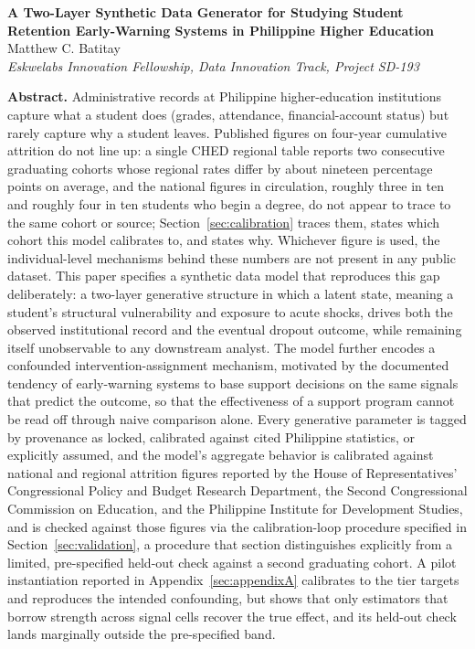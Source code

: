 \documentclass[11pt]{article}
\begin{document}
\begin{tcolorbox}[colback=titlebox,colframe=titlebox,arc=4mm,boxrule=0pt,left=10mm,right=10mm,top=6mm,bottom=6mm]
\begin{center}
{\sffamily\bfseries\LARGE A Two-Layer Synthetic Data Generator for Studying Student Retention Early-Warning Systems in Philippine Higher Education}\\[10pt]
{\large Matthew C. Batitay}\\[2pt]
{\itshape Eskwelabs Innovation Fellowship, Data Innovation Track, Project SD-193}
\end{center}
\vspace{6pt}

\noindent\textbf{Abstract.} Administrative records at Philippine higher-education institutions capture what a student does (grades, attendance, financial-account status) but rarely capture why a student leaves. Published figures on four-year cumulative attrition do not line up: a single CHED regional table reports two consecutive graduating cohorts whose regional rates differ by about nineteen percentage points on average, and the national figures in circulation, roughly three in ten and roughly four in ten students who begin a degree, do not appear to trace to the same cohort or source; Section~\ref{sec:calibration} traces them, states which cohort this model calibrates to, and states why. Whichever figure is used, the individual-level mechanisms behind these numbers are not present in any public dataset. This paper specifies a synthetic data model that reproduces this gap deliberately: a two-layer generative structure in which a latent state, meaning a student's structural vulnerability and exposure to acute shocks, drives both the observed institutional record and the eventual dropout outcome, while remaining itself unobservable to any downstream analyst. The model further encodes a confounded intervention-assignment mechanism, motivated by the documented tendency of early-warning systems to base support decisions on the same signals that predict the outcome, so that the effectiveness of a support program cannot be read off through naive comparison alone. Every generative parameter is tagged by provenance as locked, calibrated against cited Philippine statistics, or explicitly assumed, and the model's aggregate behavior is calibrated against national and regional attrition figures reported by the House of Representatives' Congressional Policy and Budget Research Department, the Second Congressional Commission on Education, and the Philippine Institute for Development Studies, and is checked against those figures via the calibration-loop procedure specified in Section~\ref{sec:validation}, a procedure that section distinguishes explicitly from a limited, pre-specified held-out check against a second graduating cohort. A pilot instantiation reported in Appendix~\ref{sec:appendixA} calibrates to the tier targets and reproduces the intended confounding, but shows that only estimators that borrow strength across signal cells recover the true effect, and its held-out check lands marginally outside the pre-specified band.
\end{tcolorbox}
\end{document}
